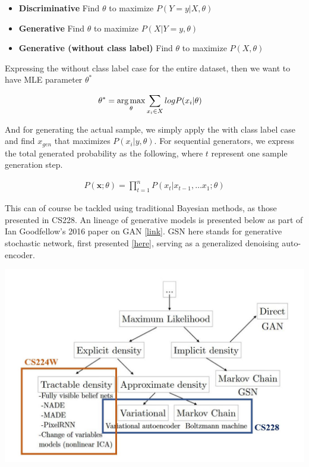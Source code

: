 \begin{itemize}
    \item \textbf{Discriminative} Find $\theta$ to maximize $P(Y=y|X, \theta)$
    
    \item \textbf{Generative} Find $\theta$ to maximize $P(X|Y=y, \theta)$
    
    \item \textbf{Generative (without class label)} Find $\theta$ to maximize $P(X, \theta)$
\end{itemize}

Expressing the without class label case for the entire dataset, then we want to have MLE parameter $\theta^{*}$

\begin{align}
    \theta^{*} &= \operatorname*{arg\,max}_{\theta} \sum_{x_i \in X} log P(x_i|\theta)
\end{align}{}

And for generating the actual sample, we simply apply the with class label case and find $x_{gen}$ that maximizes $P(x_i|y, \theta)$. For sequential generators, we express the total generated probability as the following, where $t$ represent one sample generation step.

\begin{align}
    P(\mathbf{x}; \theta) = \prod_{t=1}^{n}P(x_t|x_{t-1}, \dots x_1; \theta)
\end{align}{}

This can of course be tackled using traditional Bayesian methods, as those presented in CS228. An lineage of generative models is presented below as part of Ian Goodfellow's 2016 paper on GAN \href{https://arxiv.org/pdf/1701.00160.pdf}{[link]}. GSN here stands for generative stochastic network, first presented \href{https://arxiv.org/pdf/1503.05571.pdf}{[here]}, serving as a generalized denoising auto-encoder.

{
\centering
\includegraphics[width=0.85\linewidth]{notes/img/n6_gen_models_2.JPG} \par
}


